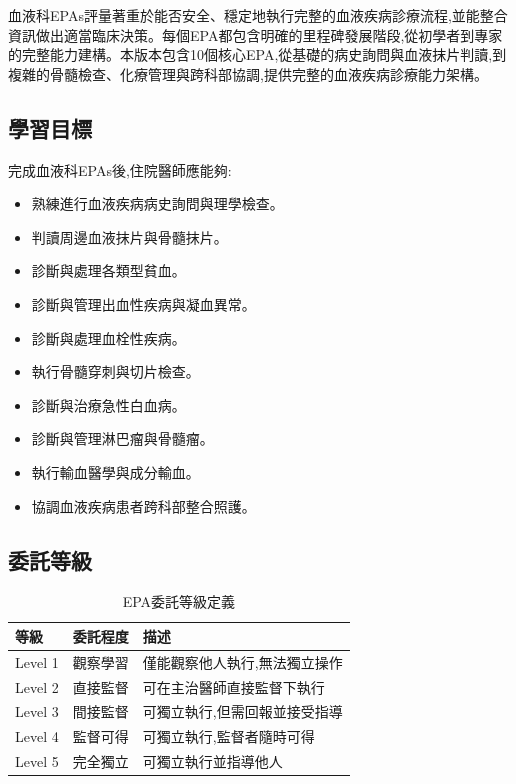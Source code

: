 \documentclass[12pt,a4paper]{article}
\newcommand{\note}[1]{
    \par
    \noindent
    \begin{tcolorbox}[
        colback=heme_crimson!5!white,
        colframe=heme_crimson,
        title=\textbf{重點提醒},
        fonttitle=\bfseries,
        boxrule=0.5pt,
        arc=3pt,
        left=6pt,
        right=6pt,
        top=6pt,
        bottom=6pt
    ]
    #1
    \end{tcolorbox}
}
\begin{document}
\vspace{0.5cm}
\note{
血液科EPAs評量著重於能否安全、穩定地執行完整的血液疾病診療流程,並能整合資訊做出適當臨床決策。每個EPA都包含明確的里程碑發展階段,從初學者到專家的完整能力建構。本版本包含10個核心EPA,從基礎的病史詢問與血液抹片判讀,到複雜的骨髓檢查、化療管理與跨科部協調,提供完整的血液疾病診療能力架構。
}

\subsection{學習目標}
完成血液科EPAs後,住院醫師應能夠:
\begin{itemize}[nosep]
    \item 熟練進行血液疾病病史詢問與理學檢查。
    \item 判讀周邊血液抹片與骨髓抹片。
    \item 診斷與處理各類型貧血。
    \item 診斷與管理出血性疾病與凝血異常。
    \item 診斷與處理血栓性疾病。
    \item 執行骨髓穿刺與切片檢查。
    \item 診斷與治療急性白血病。
    \item 診斷與管理淋巴瘤與骨髓瘤。
    \item 執行輸血醫學與成分輸血。
    \item 協調血液疾病患者跨科部整合照護。
\end{itemize}

\subsection{委託等級}
\begin{table}[h]
    \centering
    \caption{EPA委託等級定義}
    \begin{tabular}{p{2cm} p{3cm} p{9cm}}
        \toprule
        \textbf{等級} & \textbf{委託程度} & \textbf{描述} \\
        \midrule
        Level 1 & 觀察學習 & 僅能觀察他人執行,無法獨立操作 \\
        Level 2 & 直接監督 & 可在主治醫師直接監督下執行 \\
        Level 3 & 間接監督 & 可獨立執行,但需回報並接受指導 \\
        Level 4 & 監督可得 & 可獨立執行,監督者隨時可得 \\
        Level 5 & 完全獨立 & 可獨立執行並指導他人 \\
        \bottomrule
    \end{tabular}
\end{table}
\end{document}
